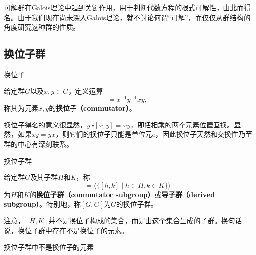 


可解群在Galois理论中起到关键作用，用于判断代数方程的根式可解性，由此而得名。由于我们现在尚未深入Galois理论，就不讨论何谓“可解”，而仅仅从群结构的角度研究这种群的性质。



\subsection{换位子群}


\begin{definition}{换位子}

给定群$G$以及$x, y\in G$，定义运算
\begin{equation}
[x, y] = x^{-1}y^{-1}xy,~
\end{equation}
称其为元素$x, y$的\textbf{换位子（commutator）}。

\end{definition}


换位子得名的意义很显然，$yx[x, y]=xy$，即把相乘的两个元素位置互换。显然，如果$xy=yx$，则它们的换位子只能是单位元$e$，因此换位子天然和交换性乃至群的中心有深刻联系。


\begin{definition}{换位子群}

给定群$G$及其子群$H$和$K$，称
\begin{equation}
[H, K] = \langle \{[h, k]\mid h\in H, k\in K\} \rangle~
\end{equation}
为$H$和$K$的\textbf{换位子群（commutator subgroup）}或\textbf{导子群（derived subgroup）}。特别地，称$[G, G]$为$G$的换位子群。

\end{definition}

注意，$[H, K]$并不是换位子构成的集合，而是由这个集合生成的子群。换句话说，换位子群中存在不是换位子的元素。

\begin{example}{换位子群中不是换位子的元素}



\end{example}




























